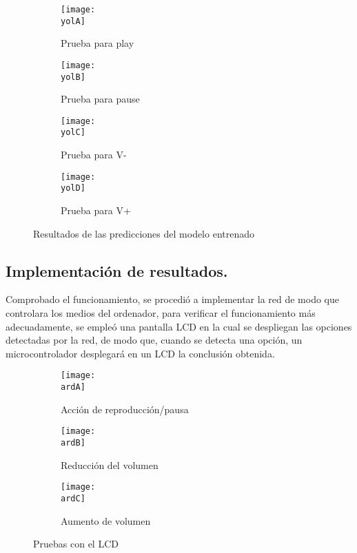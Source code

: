 \documentclass[a4paper, 12pt]{article}
\newcommand{\ardA}{img/ard_1.png}
\newcommand{\ardB}{img/ard_2.png}
\newcommand{\ardC}{img/ard_3.png}
\newcommand{\yolA}{img/test_yolo.png}
\newcommand{\yolB}{img/test_yolo1.png}
\newcommand{\yolC}{img/test_yolo2.png}
\newcommand{\yolD}{img/yolo_test3.png}
\begin{document}
    \begin{figure}[H] 
        \centering 

        \begin{subfigure}{0.45\linewidth} 
            \texttt{[image: \\yolA]} 
            \caption{Prueba para play} 
            \label{sub:play} 
        \end{subfigure} 

        \begin{subfigure}{0.45\linewidth} 
            \texttt{[image: \\yolB]} 
            \caption{Prueba para pause} 
            \label{sub:pause} 
        \end{subfigure} 

        \begin{subfigure}{0.45\linewidth} 
            \texttt{[image: \\yolC]} 
            \caption{Prueba para V-} 
            \label{sub:v+} 
        \end{subfigure} 

        \begin{subfigure}{0.45\linewidth} 
            \texttt{[image: \\yolD]} 
            \caption{Prueba para V+} 
            \label{sub:v-} 
        \end{subfigure} 

        \caption{Resultados de las predicciones del modelo entrenado} 
    \end{figure} 

    \subsection{Implementación de resultados.} 
    Comprobado el funcionamiento, se procedió a implementar la red de modo que controlara los medios del ordenador, para verificar el funcionamiento más adecuadamente, se empleó una pantalla LCD en la cual se despliegan las opciones detectadas por la red, de modo que, cuando se detecta una opción, un microcontrolador desplegará en un LCD la conclusión obtenida. 

    \begin{figure}[H]
        \centering 

        \begin{subfigure}[h]{0.6\linewidth} 
            \texttt{[image: \\ardA]} 
            \caption{Acción de reproducción/pausa} 
        \end{subfigure} 

        \begin{subfigure}[h]{0.6\linewidth} 
            \texttt{[image: \\ardB]} 
            \caption{Reducción del volumen} 
        \end{subfigure} 

        \begin{subfigure}[h]{0.6\linewidth} 
            \texttt{[image: \\ardC]} 
            \caption{Aumento de volumen} 
        \end{subfigure} 

        \caption{Pruebas con el LCD} 
    \end{figure} 
\end{document}
